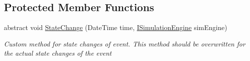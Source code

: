 \subsection*{Protected Member Functions}
\begin{DoxyCompactItemize}
\item 
abstract void \hyperlink{class_simulation_core_1_1_h_c_c_m_elements_1_1_event_ad2a390226ebe699149bf8c4fcd031f29}{State\+Change} (Date\+Time time, \hyperlink{interface_simulation_core_1_1_simulation_classes_1_1_i_simulation_engine}{I\+Simulation\+Engine} sim\+Engine)
\begin{DoxyCompactList}\small\item\em Custom method for state changes of event. This method should be overwritten for the actual state changes of the event \end{DoxyCompactList}\end{DoxyCompactItemize}

